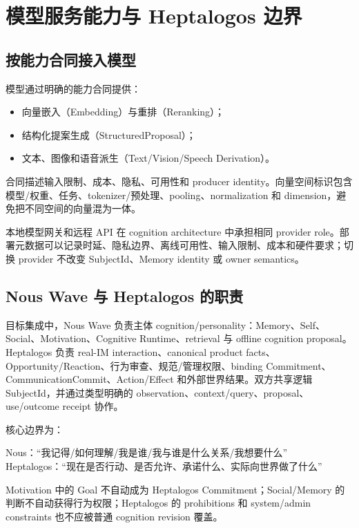 \chapter{模型服务能力与 Heptalogos 边界}

\section{按能力合同接入模型}

模型通过明确的能力合同提供：
\begin{itemize}
\item 向量嵌入（Embedding）与重排（Reranking）；
\item 结构化提案生成（StructuredProposal）；
\item 文本、图像和语音派生（Text/Vision/Speech Derivation）。
\end{itemize}
合同描述输入限制、成本、隐私、可用性和 producer identity。向量空间标识包含模型/权重、任务、tokenizer/预处理、pooling、normalization 和 dimension，避免把不同空间的向量混为一体。\cite{nous-research-package}

本地模型网关和远程 API 在 cognition architecture 中承担相同 provider role。部署元数据可以记录时延、隐私边界、离线可用性、输入限制、成本和硬件要求；切换 provider 不改变 SubjectId、Memory identity 或 owner semantics。

\section{Nous Wave 与 Heptalogos 的职责}

目标集成中，Nous Wave 负责主体 cognition/personality：Memory、Self、Social、Motivation、Cognitive Runtime、retrieval 与 offline cognition proposal。Heptalogos 负责 real-IM interaction、canonical product facts、Opportunity/Reaction、行为审查、规范/管理权限、binding Commitment、CommunicationCommit、Action/Effect 和外部世界结果。双方共享逻辑 SubjectId，并通过类型明确的 observation、context/query、proposal、use/outcome receipt 协作。\cite{nous-research-package,heptalogos-code-snapshot}

核心边界为：

\begin{center}
Nous：``我记得/如何理解/我是谁/我与谁是什么关系/我想要什么''\\
Heptalogos：``现在是否行动、是否允许、承诺什么、实际向世界做了什么''
\end{center}

Motivation 中的 Goal 不自动成为 Heptalogos Commitment；Social/Memory 的判断不自动获得行为权限；Heptalogos 的 prohibitions 和 system/admin constraints 也不应被普通 cognition revision 覆盖。

